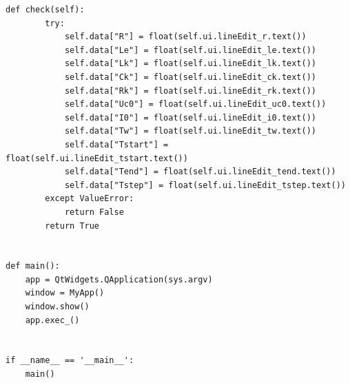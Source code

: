\documentclass[a4paper,14pt]{article}
\begin{document}
\begin{lstlisting}[label=code1,caption=\text{Класс MyApp.}]
    def check(self):
        try:
            self.data["R"] = float(self.ui.lineEdit_r.text())
            self.data["Le"] = float(self.ui.lineEdit_le.text())
            self.data["Lk"] = float(self.ui.lineEdit_lk.text())
            self.data["Ck"] = float(self.ui.lineEdit_ck.text())
            self.data["Rk"] = float(self.ui.lineEdit_rk.text())
            self.data["Uc0"] = float(self.ui.lineEdit_uc0.text())
            self.data["I0"] = float(self.ui.lineEdit_i0.text())
            self.data["Tw"] = float(self.ui.lineEdit_tw.text())
            self.data["Tstart"] = float(self.ui.lineEdit_tstart.text())
            self.data["Tend"] = float(self.ui.lineEdit_tend.text())
            self.data["Tstep"] = float(self.ui.lineEdit_tstep.text())
        except ValueError:
            return False
        return True


def main():
    app = QtWidgets.QApplication(sys.argv)
    window = MyApp()
    window.show()
    app.exec_()


if __name__ == '__main__':
    main()


\end{lstlisting}
\end{document}
